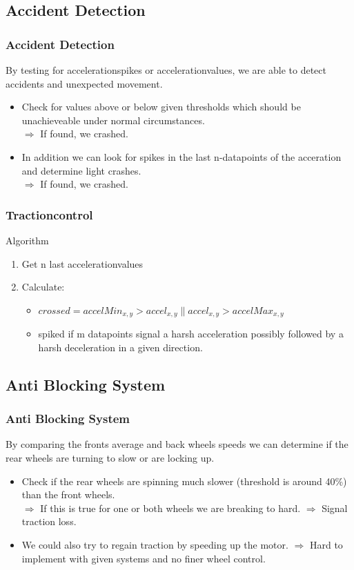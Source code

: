 \documentclass{beamer}
\begin{document}
\subsection{Accident Detection}
\begin{frame}
    \frametitle{Accident Detection}
    By testing for accelerationspikes or accelerationvalues, we are able to detect accidents and unexpected movement.\\
    \begin{itemize}
     \item Check for values above or below given thresholds which should be unachieveable under normal circumstances.\\
     $\Rightarrow$ If found, we crashed.
     \pause
     \item In addition we can look for spikes in the last n-datapoints of the acceration and determine light crashes.\\
     $\Rightarrow$ If found, we crashed.
     \pause
    \end{itemize}
\end{frame}
\begin{frame}
    \frametitle{Tractioncontrol}
    Algorithm
    \begin{enumerate}
        \item Get n last accelerationvalues
        \item Calculate: 
        \begin{itemize}
            \item $crossed = accelMin_{x,y} > accel_{x,y} \parallel accel_{x,y} > accelMax_{x,y}$
            \item spiked if m datapoints signal a harsh acceleration possibly followed by a harsh deceleration in a given direction.
        \end{itemize}
    \end{enumerate}
\end{frame}

\subsection{Anti Blocking System}
\begin{frame}
    \frametitle{Anti Blocking System}
    By comparing the fronts average and back wheels speeds we can determine if the rear wheels are turning to slow or are locking up. 
    \begin{itemize}
     \item Check if the rear wheels are spinning much slower (threshold is around 40\%) than the front wheels.\\
     $\Rightarrow$ If this is true for one or both wheels we are breaking to hard.
     $\Rightarrow$ Signal traction loss.
     \pause
     \item We could also try to regain traction by speeding up the motor. 
     $\Rightarrow$ Hard to implement with given systems and no finer wheel control. \\
     \pause
    \end{itemize}
\end{frame}
\end{document}
